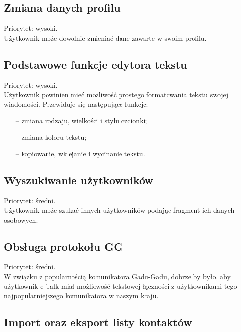 \documentclass[a4paper,12pt]{article}
\begin{document}
\subsection[Zmiana danych profilu]{Zmiana danych profilu}

Priorytet: wysoki.\\

Użytkownik może dowolnie zmieniać dane zawarte w swoim profilu.

\subsection[Podstawowe funkcje edytora tekstu]{Podstawowe funkcje edytora tekstu}

Priorytet: wysoki.\\

Użytkownik powinien mieć możliwość prostego formatowania tekstu swojej wiadomości.
Przewiduje się następujące funkcje:
\begin{itemize}
    \item[--] zmiana rodzaju, wielkości i stylu czcionki;
    \item[--] zmiana koloru tekstu;
    \item[--] kopiowanie, wklejanie i wycinanie tekstu.
\end{itemize}

\subsection[Wyszukiwanie użytkowników]{Wyszukiwanie użytkowników}
Priorytet: średni.\\

Użytkownik może szukać innych użytkowników podając fragment ich danych osobowych.

\subsection[Obsługa protokołu GG]{Obsługa protokołu GG}
Priorytet: średni.\\

W związku z popularnością komunikatora Gadu-Gadu, dobrze by było, aby użytkownik e-Talk miał możliowość tekstowej łączności z użytkownikami tego najpopularniejszego komunikatora w naszym kraju.

\subsection[Import oraz eksport listy kontaktów]{Import oraz eksport listy kontaktów}
\end{document}
